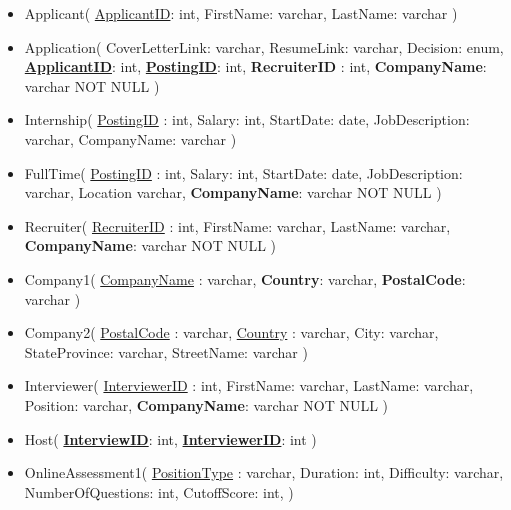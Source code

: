 \begin{itemize}

  \item Applicant(
      \underline{ApplicantID}: int, 
      FirstName: varchar, 
      LastName: varchar
    )

  \item Application(
      CoverLetterLink: varchar, 
      ResumeLink: varchar,
      Decision: enum,
      \underline{\textbf{ApplicantID}}: int,
      \underline{\textbf{PostingID}}: int,
      \textbf{RecruiterID} : int,
      \textbf{CompanyName}: varchar NOT NULL
    )

  \item Internship(
      \underline{PostingID} : int,
      Salary: int,
      StartDate: date,
      JobDescription: varchar,
      CompanyName: varchar
    )

  \item FullTime(
      \underline{PostingID} : int,
      Salary: int,
      StartDate: date,
      JobDescription: varchar,
      Location varchar,
      \textbf{CompanyName}: varchar NOT NULL
    )

  \item Recruiter(
      \underline{RecruiterID} : int,
      FirstName: varchar,
      LastName: varchar,
      \textbf{CompanyName}: varchar NOT NULL
    )

  \item Company1(
      \underline{CompanyName} : varchar,
      \textbf{Country}: varchar,
      \textbf{PostalCode}: varchar
    )

  \item Company2(
      \underline{PostalCode} : varchar, 
      \underline{Country} : varchar, 
      City: varchar, 
      StateProvince: varchar,
      StreetName: varchar
    )

  \item Interviewer(
      \underline{InterviewerID} : int,
      FirstName: varchar,
      LastName: varchar,
      Position: varchar,
      \textbf{CompanyName}: varchar NOT NULL
    )

  \item Host(
      \underline{\textbf{InterviewID}}: int,
      \underline{\textbf{InterviewerID}}: int
    )

  \item OnlineAssessment1(
      \underline{PositionType} : varchar,
      Duration: int,
      Difficulty: varchar,
      NumberOfQuestions: int,
      CutoffScore: int,
    )


\end{itemize}
